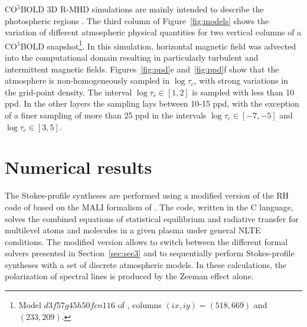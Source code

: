 \documentclass[iop,numberedappendix,twocolappendix,twocolumn]{emulateapj}
\begin{document}
CO$^5$BOLD 3D R-MHD simulations are mainly intended to describe the photospheric regions \citep[see e.g.,][]{freytag2012,calvo2016}. The third column of Figure~\ref{fig:models} shows the variation of different atmospheric physical quantities for two vertical columns of a CO$^5$BOLD snapshot\footnote{Model $d3f57g45h50fcn116$ of \citet[][Tab. 3]{steiner2017}, columns $(ix,iy)=(518,669)$ and $(233,209)$.}.
In this simulation, horizontal magnetic field was advected into the computational domain resulting in particularly turbulent and intermittent magnetic fields.
Figures~\ref{fig:ppd}e and~\ref{fig:ppd}f show that the atmosphere is non-homogeneously sampled in $\log \tau_c$, with strong variations in the grid-point density.
The interval $\log\tau_c\in[1,2]$ is sampled with less than 10 ppd.
In the other layers the sampling lays between 10-15 ppd,
with the exception of a finer sampling of more than 25 ppd in the intervals $\log\tau_c\in[-7,-5]$ and $\log\tau_c\in[3,5]$.
% 
%
\section{Numerical results}\label{sec:sec5}
%
The Stokes-profile syntheses are performed using a modified version of the RH code of \citet{uitenbroek2001}
based on the MALI formalism of \citet{rybicki1991,rybicki1992,rybicki1994}.
The code, written in the C language, solves the combined equations of statistical equilibrium and radiative transfer
for multilevel atoms and molecules in a given plasma under general NLTE conditions. 
The modified version allows to switch between the different formal solvers presented in Section~\ref{sec:sec3} and to sequentially perform Stokes-profile syntheses 
with a set of discrete atmospheric models.
In these calculations, the polarization of spectral lines is produced by the Zeeman effect alone.
\end{document}
